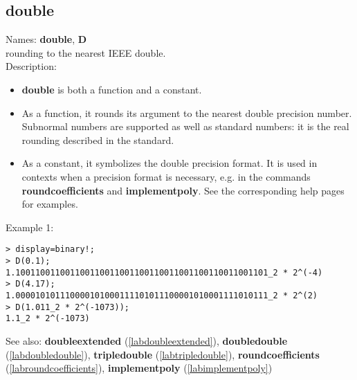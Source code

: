 \subsection{double}
\label{labdouble}
\noindent Names: \textbf{double}, \textbf{D}\\
rounding to the nearest IEEE double.\\

\noindent Description: \begin{itemize}

\item \textbf{double} is both a function and a constant.

\item As a function, it rounds its argument to the nearest double precision number.
   Subnormal numbers are supported as well as standard numbers: it is the real
   rounding described in the standard.

\item As a constant, it symbolizes the double precision format. It is used in 
   contexts when a precision format is necessary, e.g. in the commands 
   \textbf{roundcoefficients} and \textbf{implementpoly}.
   See the corresponding help pages for examples.
\end{itemize}
\noindent Example 1: 
\begin{center}\begin{minipage}{15cm}\begin{Verbatim}[frame=single]
> display=binary!;
> D(0.1);
1.100110011001100110011001100110011001100110011001101_2 * 2^(-4)
> D(4.17);
1.000010101110000101000111101011100001010001111010111_2 * 2^(2)
> D(1.011_2 * 2^(-1073));
1.1_2 * 2^(-1073)
\end{Verbatim}
\end{minipage}\end{center}
See also: \textbf{doubleextended} (\ref{labdoubleextended}), \textbf{doubledouble} (\ref{labdoubledouble}), \textbf{tripledouble} (\ref{labtripledouble}), \textbf{roundcoefficients} (\ref{labroundcoefficients}), \textbf{implementpoly} (\ref{labimplementpoly})
